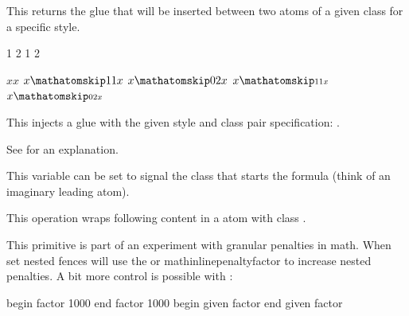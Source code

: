 \stopnewprimitive

\startnewprimitive[title={\prm {mathatomglue}}]

This returns the glue that will be inserted between two atoms of a given class
for a specific style.

\startbuffer
\the\mathatomglue {} 1
\the\mathatomglue {} 2
\the\mathatomglue {} 1
\the\mathatomglue {} 2
\stopbuffer

\typebuffer

\startlines \tttf
\getbuffer
\stoplines

\stopnewprimitive

\startnewprimitive[title={\prm {mathatomskip}}]

\startbuffer
$x x$
$x \mathatomskip \textstyle   1 1 x$
$x \mathatomskip \textstyle   0 2 x$
$x \mathatomskip \scriptstyle 1 1 x$
$x \mathatomskip \scriptstyle 0 2 x$
\stopbuffer

This injects a glue with the given style and class pair specification:
\inlinebuffer.

\typebuffer

\stopnewprimitive

\startnewprimitive[title={\prm {mathbackwardpenalties}}]

See  for an explanation.

\stopnewprimitive

\startnewprimitive[title={\prm {mathbeginclass}}]

This variable can be set to signal the class that starts the formula (think of an
imaginary leading atom).

\stopnewprimitive

\startoldprimitive[title={\prm {mathbin}}]

This operation wraps following content in a atom with class .

\stopoldprimitive

\startnewprimitive[title={\prm {mathboundary}}]

This primitive is part of an experiment with granular penalties in math. When set
nested fences will use the  or \prm
{mathinlinepenaltyfactor} to increase nested penalties. A bit more control is
possible with :

\starttabulate[||||]
 \NC begin \NC factor 1000  \NC \NR
{} \NC end   \NC factor 1000  \NC \NR
{} \NC begin \NC given factor \NC \NR
{} \NC end   \NC given factor \NC \NR
\stoptabulate

